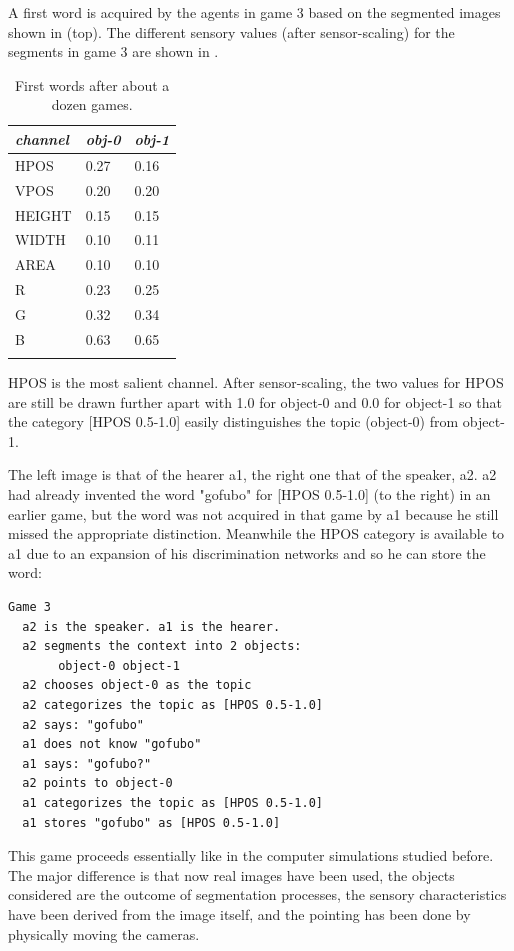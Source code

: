 A first word is acquired by the agents in game 3 
based on the segmented images shown in  (top).
The different sensory values (after sensor-scaling)
for the segments in game 3 are shown in . 
\begin{table}
\begin{center}
\begin{tabular}{ l  l  l }
\lsptoprule
{\itshape channel}& {\itshape obj-0} & {\itshape obj-1}\\ \midrule
HPOS & 0.27 & 0.16\\ 
VPOS & 0.20 & 0.20\\ 
HEIGHT & 0.15 & 0.15\\ 
WIDTH & 0.10 & 0.11\\ 
AREA & 0.10 & 0.10\\ 
R & 0.23 & 0.25\\ 
G & 0.32 & 0.34\\ 
B & 0.63 & 0.65\\ 
\lspbottomrule
\end{tabular}
\caption{ \label{tab:game3b} First words after about a dozen games.}
\end{center}
\end{table}
HPOS is the most salient channel. After sensor-scaling, 
the two values for HPOS are still be drawn further
apart with 1.0 for object-0 and 
0.0 for object-1 so that the category [HPOS 0.5-1.0] easily 
distinguishes the topic (object-0) from object-1.

The left image is that of the hearer {\bfshape a1}, the right one
that of the speaker, {\bfshape a2}.
{\bfshape a2} had already invented the word "gofubo" for 
[HPOS 0.5-1.0] (to the right) in an earlier game, 
but the word was not acquired in that game
by {\bfshape a1} because he still missed the 
appropriate distinction. Meanwhile the HPOS category 
is available to {\bfshape a1} due to an
expansion of his discrimination networks
and so he can store the word: 
\begin{verbatim}
Game 3 
  a2 is the speaker. a1 is the hearer. 
  a2 segments the context into 2 objects: 
       object-0 object-1
  a2 chooses object-0 as the topic 
  a2 categorizes the topic as [HPOS 0.5-1.0]
  a2 says: "gofubo"
  a1 does not know "gofubo"
  a1 says: "gofubo?"
  a2 points to object-0
  a1 categorizes the topic as [HPOS 0.5-1.0]
  a1 stores "gofubo" as [HPOS 0.5-1.0]
\end{verbatim}
This game proceeds essentially like in the computer
simulations studied before. The major difference is
that now real images have been used, the objects
considered are the outcome of segmentation processes,
the sensory characteristics have been derived from the 
image itself, and the pointing has been done by 
physically moving the cameras. 

